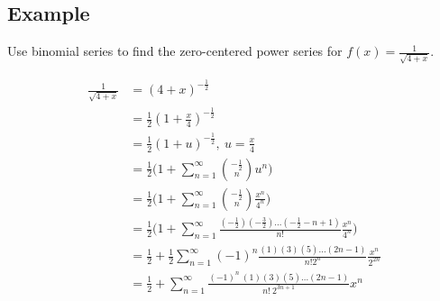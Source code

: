 \documentclass{article}
\theoremstyle{mytheoremstyle}
\theoremstyle{mytheoremstyle}
\theoremstyle{myproblemstyle}
\begin{document}
    \subsection*{Example}
    Use binomial series to find the zero-centered power series for
    $f(x)=\frac{1}{\sqrt{4+x}}$.

    \begin{align*}
        \frac{1}{\sqrt{4+x}}
        &= (4+x)^{-\frac{1}{2}} \\
        &= \frac{1}{2} (1+\frac{x}{4})^{-\frac{1}{2}} \\
        &= \frac{1}{2} (1 + u)^{-\frac{1}{2}},\ u = \frac{x}{4} \\
        &= \frac{1}{2} \Big(1+\sum_{n=1}^{\infty} \binom{-\frac{1}{2}}{n} u^n\Big) \\
        &= \frac{1}{2} \Big(1+\sum_{n=1}^{\infty} \binom{-\frac{1}{2}}{n} \frac{x^n}{4^n}\Big) \\
        &= \frac{1}{2} \Big(1 + \sum_{n=1}^{\infty} \frac{(-\frac{1}{2})(-\frac{3}{2})\dots(-\frac{1}{2}-n+1)}{n!} \frac{x^n}{4^n}\Big) \\
        &= \frac{1}{2} + \frac{1}{2}\sum_{n=1}^{\infty} (-1)^n \frac{(1)(3)(5)\dots(2n-1)}{n!2^n} \frac{x^n}{2^{2n}} \\
        &= \frac{1}{2} + \sum_{n=1}^{\infty}
        \frac{(-1)^n\ (1)(3)(5)\dots(2n-1)}{n!\ 2^{3n+1}} x^n
    \end{align*}
\end{document}
